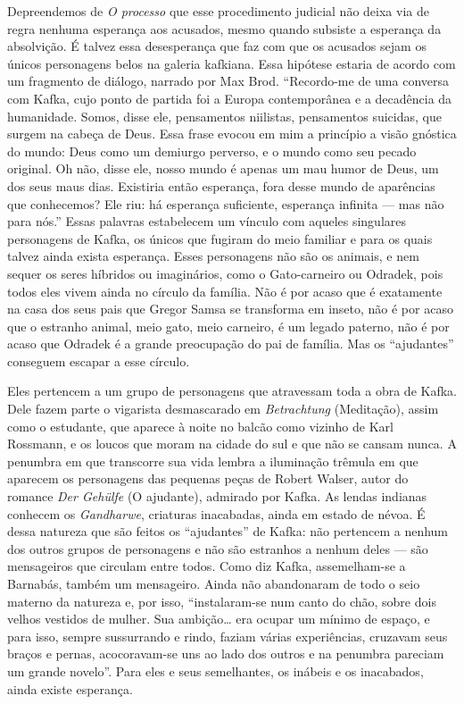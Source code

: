 Depreendemos de \textit{O processo} que esse procedimento judicial não deixa
via de regra nenhuma esperança aos acusados, mesmo quando subsiste a
esperança da absolvição. É talvez essa desesperança que faz com que os
acusados sejam os únicos personagens belos na galeria kafkiana. Essa
hipótese estaria de acordo com um fragmento de diálogo, narrado por Max
Brod. ``Recordo-me de uma conversa com Kafka, cujo ponto de partida foi
a Europa contemporânea e a decadência da humanidade. Somos, disse ele,
pensamentos niilistas, pensamentos suicidas, que surgem na cabeça de
Deus. Essa frase evocou em mim a princípio a visão gnóstica do mundo:
Deus como um demiurgo perverso, e o mundo como seu pecado original. Oh
não, disse ele, nosso mundo é apenas um mau humor de Deus, um dos seus
maus dias. Existiria então esperança, fora desse mundo de aparências que
conhecemos? Ele riu: há esperança suficiente, esperança infinita --- mas
não para nós.'' Essas palavras estabelecem um vínculo com aqueles
singulares personagens de Kafka, os únicos que fugiram do meio familiar
e para os quais talvez ainda exista esperança. Esses personagens não são
os animais, e nem sequer os seres híbridos ou imaginários, como o
Gato-carneiro ou Odradek, pois todos eles vivem ainda no círculo da
família. Não é por acaso que é exatamente na casa dos seus pais que
Gregor Samsa se transforma em inseto, não é por acaso que o estranho
animal, meio gato, meio carneiro, é um legado paterno, não é por acaso
que Odradek é a grande preocupação do pai de família. Mas os
``ajudantes'' conseguem escapar a esse círculo.

Eles pertencem a um grupo de personagens que atravessam toda a obra de
Kafka. Dele fazem parte o vigarista desmascarado em \textit{Betrachtung}
(Meditação), assim como o estudante, que aparece à noite no balcão
como vizinho de Karl Rossmann, e os loucos que moram na cidade do sul e
que não se cansam nunca. A penumbra em que transcorre sua vida lembra a
iluminação trêmula em que aparecem os personagens das pequenas peças de
Robert Walser, autor do romance \textit{Der Gehülfe} (O ajudante), admirado
por Kafka. As lendas indianas conhecem os \textit{Gandharwe}, criaturas
inacabadas, ainda em estado de névoa. É dessa natureza que são feitos os
``ajudantes'' de Kafka: não pertencem a nenhum dos outros grupos de
personagens e não são estranhos a nenhum deles --- são mensageiros que
circulam entre todos. Como diz Kafka, assemelham-se a Barnabás, também
um mensageiro. Ainda não abandonaram de todo o seio materno da natureza
e, por isso, ``instalaram-se num canto do chão, sobre dois velhos
vestidos de mulher. Sua ambição\ldots{} era ocupar um mínimo de espaço, e
para isso, sempre sussurrando e rindo, faziam várias experiências,
cruzavam seus braços e pernas, acocoravam-se uns ao lado dos outros e na
penumbra pareciam um grande novelo''. Para eles e seus semelhantes, os
inábeis e os inacabados, ainda existe esperança.


